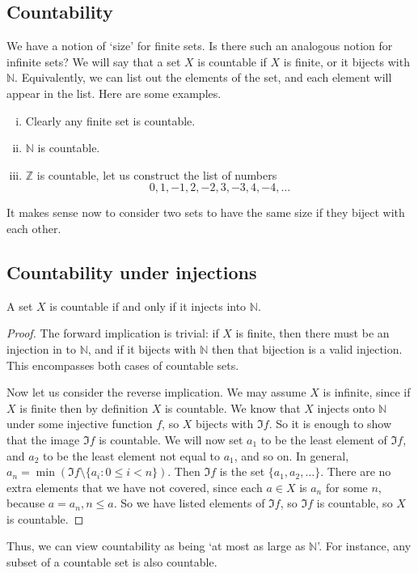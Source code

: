 \subsection{Countability}
We have a notion of `size' for finite sets.
Is there such an analogous notion for infinite sets?
We will say that a set \(X\) is countable if \(X\) is finite, or it bijects with \(\mathbb N\).
Equivalently, we can list out the elements of the set, and each element will appear in the list.
Here are some examples.
\begin{enumerate}[(i)]
	\item Clearly any finite set is countable.
	\item \(\mathbb N\) is countable.
	\item \(\mathbb Z\) is countable, let us construct the list of numbers
	      \[
		      0, 1, -1, 2, -2, 3, -3, 4, -4, \dots
	      \]
\end{enumerate}
It makes sense now to consider two sets to have the same size if they biject with each other.

\subsection{Countability under injections}
\begin{proposition}
	A set \(X\) is countable if and only if it injects into \(\mathbb N\).
\end{proposition}
\begin{proof}
	The forward implication is trivial: if \(X\) is finite, then there must be an injection in to \(\mathbb N\), and if it bijects with \(\mathbb N\) then that bijection is a valid injection.
	This encompasses both cases of countable sets.

	Now let us consider the reverse implication.
	We may assume \(X\) is infinite, since if \(X\) is finite then by definition \(X\) is countable.
	We know that \(X\) injects onto \(\mathbb N\) under some injective function \(f\), so \(X\) bijects with \(\Im f\).
	So it is enough to show that the image \(\Im f\) is countable.
	We will now set \(a_1\) to be the least element of \(\Im f\), and \(a_2\) to be the least element not equal to \(a_1\), and so on.
	In general, \(a_n = \min (\Im f \setminus \{ a_i : 0 \leq i < n \})\).
	Then \(\Im f\) is the set \(\{ a_1, a_2, \dots \}\).
	There are no extra elements that we have not covered, since each \(a \in X\) is \(a_n\) for some \(n\), because \(a=a_n, n \leq a\).
	So we have listed elements of \(\Im f\), so \(\Im f\) is countable, so \(X\) is countable.
\end{proof}
Thus, we can view countability as being `at most as large as \(\mathbb N\)'.
For instance, any subset of a countable set is also countable.

